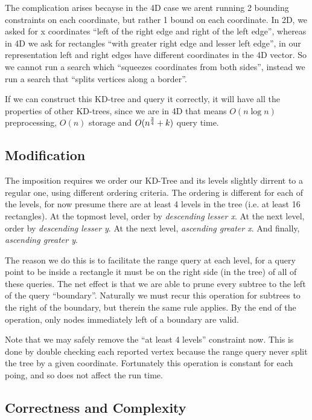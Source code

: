 The complication arises becayse in the 4D case we arent running 2 bounding constraints on each coordinate, but rather 1 bound on each coordinate.
In 2D, we asked for x coordinates ``left of the right edge and right of the left edge'', whereas in 4D we ask for rectangles ``with greater right edge and lesser left edge'', in our representation left and right edges have different coordinates in the 4D vector.
So we cannot run a search which ``squeezes coordinates from both sides'', instead we run a search that ``splits vertices along a border''.

If we can construct this KD-tree and query it correctly, it will have all the properties of other KD-trees, since we are in 4D that means $O(n \log n)$ preprocessing, $O(n)$ storage and $O(n^{3 \over 4} + k)$ query time.

\subsection{Modification}

The imposition requires we order our KD-Tree and its levels slightly dirrent to a regular one, using different ordering criteria.
The ordering is different for each of the levels, for now presume there are at least 4 levels in the tree (i.e. at least 16 rectangles).
At the topmost level, order by {\em descending lesser x}.
At the next level, order by {\em descending lesser y}.
At the next level, {\em ascending greater x}.
And finally, {\em ascending greater y}.

The reason we do this is to facilitate the range query at each level, for a query point to be inside a rectangle it must be on the right side (in the tree) of all of these queries.
The net effect is that we are able to prune every subtree to the left of the query ``boundary''.
Naturally we must recur this operation for subtrees to the right of the boundary, but therein the same rule applies.
By the end of the operation, only nodes immediately left of a boundary are valid.

Note that we may safely remove the ``at least 4 levels'' constraint now.
This is done by double checking each reported vertex because the range query never split the tree by a given coordinate.
Fortunately this operation is constant for each poing, and so does not affect the run time.

\subsection{Correctness and Complexity}


